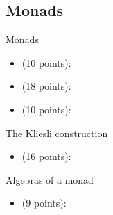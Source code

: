 \subsection{Monads}

Monads
\begin{itemize}
    \item {} (10 points): 
    \item {} (18 points): 
    \item {} (10 points): 
\end{itemize}
The Kliesli construction
\begin{itemize}
    \item {} (16 points): 
\end{itemize}
Algebras of a monad
\begin{itemize}
    \item {} (9 points): 
\end{itemize}